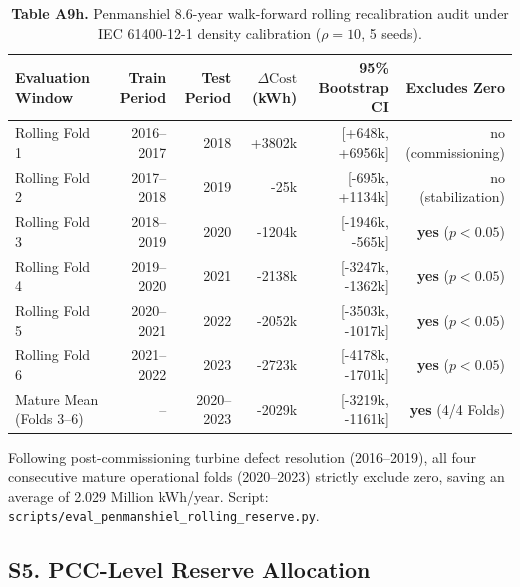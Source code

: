 \documentclass[
  journal]{IEEEtran}
\begin{document}
\begin{table}[!t]
\centering
\fontsize{8.0pt}{9.6pt}\selectfont
\setlength{\tabcolsep}{2.5pt}
\renewcommand{\arraystretch}{1.05}
\caption*{\textbf{Table A9h.} Penmanshiel 8.6-year walk-forward rolling recalibration audit under IEC 61400-12-1 density calibration ($\rho=10$, 5 seeds).}
%
\begin{tabular}{lrrrrr}
\toprule
Evaluation Window & Train Period & Test Period & $\Delta\text{Cost}$ (kWh) & 95\% Bootstrap CI & Excludes Zero \\
\midrule
Rolling Fold 1 & 2016--2017 & 2018 & +3802k & [+648k, +6956k] & no (commissioning) \\
Rolling Fold 2 & 2017--2018 & 2019 & -25k & [-695k, +1134k] & no (stabilization) \\
Rolling Fold 3 & 2018--2019 & 2020 & -1204k & [-1946k, -565k] & \textbf{yes} ($p<0.05$) \\
Rolling Fold 4 & 2019--2020 & 2021 & -2138k & [-3247k, -1362k] & \textbf{yes} ($p<0.05$) \\
Rolling Fold 5 & 2020--2021 & 2022 & -2052k & [-3503k, -1017k] & \textbf{yes} ($p<0.05$) \\
Rolling Fold 6 & 2021--2022 & 2023 & -2723k & [-4178k, -1701k] & \textbf{yes} ($p<0.05$) \\
\midrule
Mature Mean (Folds 3--6) & -- & 2020--2023 & -2029k & [-3219k, -1161k] & \textbf{yes} (4/4 Folds) \\
\bottomrule
\end{tabular}
\vspace{1mm}
\fontsize{8.0pt}{9.6pt}\selectfont Following post-commissioning turbine defect resolution (2016--2019), all four consecutive mature operational folds (2020--2023) strictly exclude zero, saving an average of 2.029 Million kWh/year. Script: \texttt{scripts/eval\_penmanshiel\_rolling\_reserve.py}.
\end{table}

\FloatBarrier

\subsection*{S5. PCC-Level Reserve
Allocation}\label{s5.-pcc-level-reserve-allocation}
\end{document}
